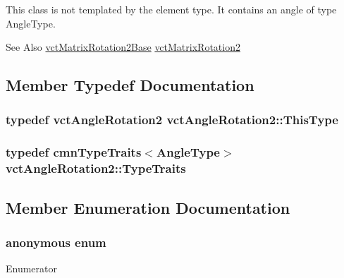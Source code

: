 This class is not templated by the element type. It contains an angle of type Angle\-Type.

\begin{DoxySeeAlso}{See Also}
\hyperlink{classvct_matrix_rotation2_base}{vct\-Matrix\-Rotation2\-Base} \hyperlink{classvct_matrix_rotation2}{vct\-Matrix\-Rotation2} 
\end{DoxySeeAlso}


\subsection{Member Typedef Documentation}
\hypertarget{classvct_angle_rotation2_a67339254f084f89c13aca70c1242d18e}{
\subsubsection[{This\-Type}]{\setlength{\rightskip}{0pt plus 5cm}typedef {\bf vct\-Angle\-Rotation2} {\bf vct\-Angle\-Rotation2\-::\-This\-Type}}}\label{classvct_angle_rotation2_a67339254f084f89c13aca70c1242d18e}
\hypertarget{classvct_angle_rotation2_a218a0396bd24a4b2ece9e886a84a567c}{
\subsubsection[{Type\-Traits}]{\setlength{\rightskip}{0pt plus 5cm}typedef {\bf cmn\-Type\-Traits}$<$Angle\-Type$>$ {\bf vct\-Angle\-Rotation2\-::\-Type\-Traits}}}\label{classvct_angle_rotation2_a218a0396bd24a4b2ece9e886a84a567c}


\subsection{Member Enumeration Documentation}
\hypertarget{classvct_angle_rotation2_afbea62c89658b43900b288ac6f3981e6}{\subsubsection[{anonymous enum}]{\setlength{\rightskip}{0pt plus 5cm}anonymous enum}}\label{classvct_angle_rotation2_afbea62c89658b43900b288ac6f3981e6}
\begin{Desc}
\item[Enumerator]\par
\begin{description}
\item[{\em 
\hypertarget{classvct_angle_rotation2_afbea62c89658b43900b288ac6f3981e6a511d05c6ad1614fcd0459444b62b4364}{D\-I\-M\-E\-N\-S\-I\-O\-N}\label{classvct_angle_rotation2_afbea62c89658b43900b288ac6f3981e6a511d05c6ad1614fcd0459444b62b4364}
}]\end{description}
\end{Desc}


